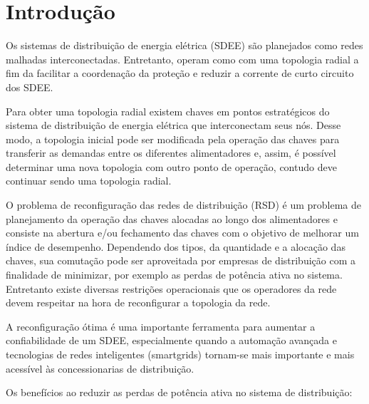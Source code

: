 \section{Introdução}

Os sistemas de distribuição de energia elétrica (SDEE) são planejados como redes malhadas interconectadas.
Entretanto, operam como com uma topologia radial a fim da facilitar a coordenação da proteção e reduzir a corrente de curto circuito dos SDEE.

Para obter uma topologia radial existem chaves em pontos estratégicos do sistema de distribuição de energia elétrica que interconectam seus nós.
Desse modo, a topologia inicial pode ser modificada pela operação das chaves para transferir as demandas entre os diferentes alimentadores e, assim, é possível determinar uma nova topologia com outro ponto de operação, contudo deve continuar sendo uma topologia radial.

O problema de reconfiguração das redes de distribuição (RSD) é um problema de planejamento da operação das chaves alocadas ao longo dos alimentadores e consiste na abertura e/ou fechamento das chaves com o objetivo de melhorar um índice de desempenho.
Dependendo dos tipos, da quantidade e a alocação das chaves, sua comutação pode ser aproveitada por empresas de distribuição com a finalidade de minimizar, por exemplo as perdas de potência ativa no sistema. Entretanto existe diversas restrições operacionais que os operadores da rede devem respeitar na hora de reconfigurar a topologia da rede.

A reconfiguração ótima é uma importante ferramenta para aumentar a confiabilidade de um SDEE, especialmente quando a automação avançada e tecnologias de redes inteligentes (smartgrids) tornam-se mais importante e mais acessível às concessionarias de distribuição.

Os benefícios ao reduzir as perdas de potência ativa no sistema de distribuição:

